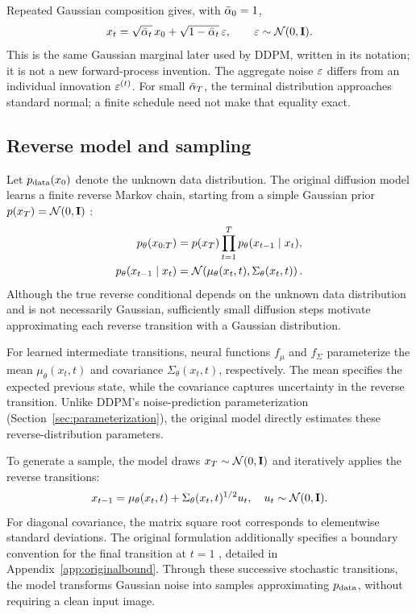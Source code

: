 Repeated Gaussian composition gives, with $\bar{\alpha}_0=1$,
\begin{equation}
x_t=\sqrt{\bar{\alpha}_t}\,x_0+\sqrt{1-\bar{\alpha}_t}\,\varepsilon,
\qquad\varepsilon\sim\mathcal{N}(0,\mathbf{I}).\label{eq:closed}
\end{equation}
This is the same Gaussian marginal later used by DDPM, written in its
notation; it is not a new forward-process invention. The aggregate noise
$\varepsilon$ differs from an individual innovation $\varepsilon^{(t)}$.
For small $\bar{\alpha}_T$, the terminal distribution approaches standard normal;
a finite schedule need not make that equality exact.

\subsection{Reverse model and sampling}\label{sec:reversemodel}

Let $p_{\rm data}(x_0)$ denote the unknown data distribution.
The original diffusion model learns a finite reverse Markov chain,
starting from a simple Gaussian prior
$p(x_T)=\mathcal{N}(0,\mathbf{I})$ \cite[Sec.~2.2]{sohl2015diffusion}:
\begin{align}
p_\theta(x_{0:T})
&=p(x_T)\prod_{t=1}^T p_\theta(x_{t-1}\mid x_t),
\nonumber\\
p_\theta(x_{t-1}\mid x_t)
&=\mathcal{N}\!\left(
\mu_\theta(x_t,t),\Sigma_\theta(x_t,t)
\right).
\label{eq:reversemodel}
\end{align}
Although the true reverse conditional depends on the unknown data
distribution and is not necessarily Gaussian, sufficiently small
diffusion steps motivate approximating each reverse transition
with a Gaussian distribution.

For learned intermediate transitions, neural functions
$f_\mu$ and $f_\Sigma$ parameterize the mean
$\mu_\theta(x_t,t)$ and covariance $\Sigma_\theta(x_t,t)$,
respectively. The mean specifies the expected previous state,
while the covariance captures uncertainty in the reverse transition.
Unlike DDPM's noise-prediction parameterization
(Section~\ref{sec:parameterization}), the original model directly
estimates these reverse-distribution parameters.

To generate a sample, the model draws
$x_T\sim\mathcal{N}(0,\mathbf{I})$ and iteratively applies the
reverse transitions:
\begin{equation}
x_{t-1}
=\mu_\theta(x_t,t)
+\Sigma_\theta(x_t,t)^{1/2}u_t,
\quad u_t\sim\mathcal{N}(0,\mathbf{I}).
\label{eq:originalsampling}
\end{equation}
For diagonal covariance, the matrix square root corresponds
to elementwise standard deviations.
The original formulation additionally specifies a boundary
convention for the final transition at $t=1$
\cite[App.~B.2]{sohl2015diffusion}, detailed in
Appendix~\ref{app:originalbound}.
Through these successive stochastic transitions, the model
transforms Gaussian noise into samples approximating
$p_{\rm data}$, without requiring a clean input image.


